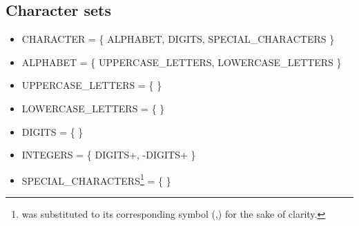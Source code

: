 \subsection{Character sets}
\begin{itemize}
  \item CHARACTER = \{ ALPHABET, DIGITS, SPECIAL\_CHARACTERS \}
  \item ALPHABET = \{ UPPERCASE\_LETTERS, LOWERCASE\_LETTERS \}
  \item UPPERCASE\_LETTERS = \{  \}
  \item LOWERCASE\_LETTERS = \{  \}
  \item DIGITS = \{  \}
  \item INTEGERS = \{ DIGITS+, -DIGITS+ \}
  \item SPECIAL\_CHARACTERS\footnote{ was substituted to its corresponding symbol (,) for the sake of clarity.} = \{  \}
\end{itemize}